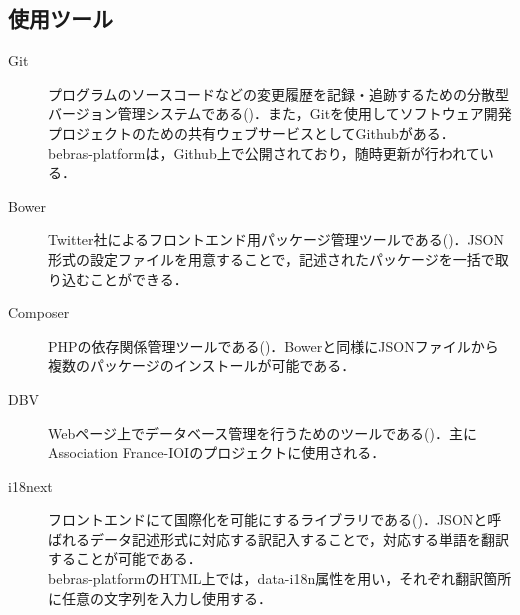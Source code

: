\documentclass[a4paper]{jarticle}
\begin{document}
\begin{multicols}{2}
\subsection{使用ツール}
\begin{description}
\item[Git]プログラムのソースコードなどの変更履歴を記録・追跡するための分散型バージョン管理システムである(\cite{git})．また，Gitを使用してソフトウェア開発プロジェクトのための共有ウェブサービスとしてGithubがある．\\ bebras-platformは，Github上で公開されており，随時更新が行われている．
\end{description}

\begin{description}
\item[Bower]Twitter社によるフロントエンド用パッケージ管理ツールである(\cite{bower})．JSON形式の設定ファイルを用意することで，記述されたパッケージを一括で取り込むことができる．\end{description}

\begin{description}
\item[Composer] PHPの依存関係管理ツールである(\cite{composer})．Bowerと同様にJSONファイルから複数のパッケージのインストールが可能である．
\end{description}

\begin{description}
\item[DBV]  Webページ上でデータベース管理を行うためのツールである(\cite{dbv})．主にAssociation France-IOIのプロジェクトに使用される．\end{description}

\begin{description}
\item[i18next] フロントエンドにて国際化を可能にするライブラリである(\cite{i18n})．JSONと呼ばれるデータ記述形式に対応する訳記入することで，対応する単語を翻訳することが可能である．\\bebras-platformのHTML上では，data-i18n属性を用い，それぞれ翻訳箇所に任意の文字列を入力し使用する．
\end{description}


\end{multicols}
\end{document}
